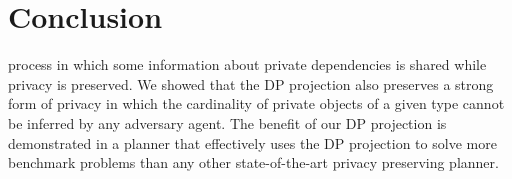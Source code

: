 \documentclass[letterpaper]{article}
\theoremstyle{definition}
\begin{document}






\section{Conclusion}
 process in which some information about private dependencies is shared while privacy is preserved. We showed that the DP projection also preserves a strong form of privacy in which the cardinality of private objects of a given type cannot be inferred by any adversary agent. The benefit of our DP projection is demonstrated in a planner that effectively uses the DP projection to solve more benchmark problems than any other state-of-the-art privacy preserving planner.
\end{document}
